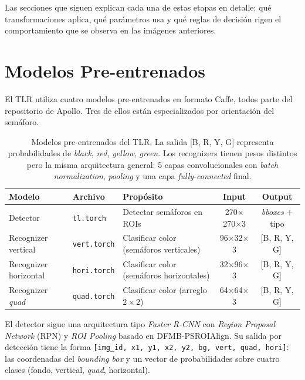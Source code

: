 Las secciones que siguen explican cada una de estas etapas en detalle: qué transformaciones aplica, qué parámetros usa y qué reglas de decisión rigen el comportamiento que se observa en las imágenes anteriores.

\section{Modelos Pre-entrenados}

El TLR utiliza cuatro modelos pre-entrenados en formato Caffe, todos parte del repositorio de Apollo. Tres de ellos están especializados por orientación del semáforo.

\begin{table}[H]
\centering
\footnotesize
\begin{tabularx}{\textwidth}{|l|l|X|c|c|}
\hline
\textbf{Modelo} & \textbf{Archivo} & \textbf{Propósito} & \textbf{Input} & \textbf{Output} \\
\hline
Detector & \texttt{tl.torch} & Detectar semáforos en ROIs & 270$\times$270$\times$3 & \textit{bboxes} + tipo \\
\hline
Recognizer vertical & \texttt{vert.torch} & Clasificar color (semáforos verticales) & 96$\times$32$\times$3 & [B, R, Y, G] \\
\hline
Recognizer horizontal & \texttt{hori.torch} & Clasificar color (semáforos horizontales) & 32$\times$96$\times$3 & [B, R, Y, G] \\
\hline
Recognizer \textit{quad} & \texttt{quad.torch} & Clasificar color (arreglo $2\times2$) & 64$\times$64$\times$3 & [B, R, Y, G] \\
\hline
\end{tabularx}
\caption[Modelos pre-entrenados del TLR.]{Modelos pre-entrenados del TLR. La salida [B, R, Y, G] representa probabilidades de \textit{black}, \textit{red}, \textit{yellow}, \textit{green}. Los recognizers tienen pesos distintos pero la misma arquitectura general: 5 capas convolucionales con \textit{batch normalization}, \textit{pooling} y una capa \textit{fully-connected} final.}
\end{table}

El detector sigue una arquitectura tipo \textit{Faster R-CNN} con \textit{Region Proposal Network} (RPN) y \textit{ROI Pooling} basado en DFMB-PSROIAlign. Su salida por detección tiene la forma \texttt{[img\_id, x1, y1, x2, y2, bg, vert, quad, hori]}: las coordenadas del \textit{bounding box} y un vector de probabilidades sobre cuatro clases (fondo, vertical, \textit{quad}, horizontal).

